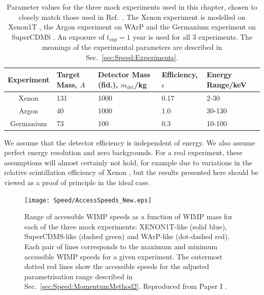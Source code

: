 \begin{table}[t]
  \setlength{\extrarowheight}{2pt}
  \begin{center}
    \begin{tabular}{c|m{1.2cm}m{2.2cm}m{2cm}m{2.1cm}}
    \hline\hline
    Experiment  & Target Mass, $A$ & Detector Mass (fid.), $m_\textrm{det}$/kg & Efficiency, $\epsilon$ & Energy Range/keV\\
	\hline
	Xenon  & 131  & 1000 & 0.17  & 2-30 \\
	Argon  & 40  & 1000 & 1.0 & 30-130  \\
        Germanium  & 73  & 100 & 0.3  & 10-100 \\
        \hline\hline
    \end{tabular}
  \end{center}
  \caption[Parameter values for the mock experiments used in Chapter \ref{ch:Speed}]{Parameter values for the three mock experiments used in this chapter, chosen to closely match those used in Ref.\ \cite{Peter:2011}. The Xenon experiment is modelled on Xenon1T \cite{Aprile:2009a}, the Argon experiment on WArP \cite{Szelc:2009} and the Germanium experiment on SuperCDMS \cite{Bruch:2010}. An exposure of $t_\textrm{exp} = 1 \textrm{ year}$ is used for all 3 experiments. The meanings of the experimental parameters are described in Sec.\ \ref{sec:Speed:Experiments}.}
\label{tab:Speed:Expts}
\end{table}

We assume that the detector efficiency is independent of energy. We also assume perfect energy resolution and zero backgrounds. For a real experiment, these assumptions will almost certainly not hold, for example due to variations in the relative scintillation efficiency of Xenon \cite{Aprile:2009b}, but the results presented here should be viewed as a proof of principle in the ideal case.

\begin{figure}[t]
  \centering
  \texttt{[image: Speed/AccessSpeeds\_New.eps]}
\caption[Range of accessible WIMP speeds for mock direct detection experiments]{Range of accessible WIMP speeds as a function of WIMP mass for each of the three mock experiments: XENON1T-like (solid blue), SuperCDMS-like (dashed green) and WArP-like (dot-dashed red). Each pair of lines corresponds to the maximum and minimum accessible WIMP speeds for a given experiment. The outermost dotted red lines show the accessible speeds for the adjusted parametrisation range described in Sec.~\ref{sec:Speed:MomentumMethod2}. Reproduced from Paper I \cite{Kavanagh:2012}.}
  \label{fig:Speed:Access}
\end{figure}

